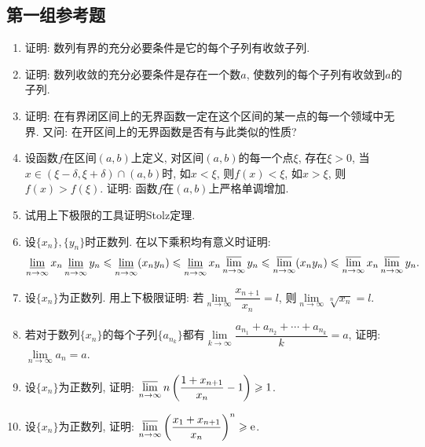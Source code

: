 \documentclass[a4paper,11pt,twoside]{ctexbook}
\newcommand{\e}{\mathrm e}
\begin{document}
\subsection{第一组参考题}
\begin{enumerate}
	\item 证明: 数列有界的充分必要条件是它的每个子列有收敛子列.

	\item 证明: 数列收敛的充分必要条件是存在一个数$a$, 使数列的每个子列有收敛到$a$的子列.

	\item 证明: 在有界闭区间上的无界函数一定在这个区间的某一点的每一个领域中无界. 又问: 在开区间上的无界函数是否有与此类似的性质?

	\item 设函数$f$在区间$(a,b)$上定义, 对区间$(a,b)$的每一个点$\xi$, 存在$\xi>0$, 当$x\in(\xi-\delta,\xi+\delta)\cap(a,b)$时, 如$x<\xi$, 则$f(x)<\xi$, 如$x>\xi$, 则$f(x)>f(\xi)$. 证明: 函数$f$在$(a,b)$上严格单调增加.

	\item 试用上下极限的工具证明Stolz定理.

	\item 设$\{x_n\}, \{y_n\}$时正数列. 在以下乘积均有意义时证明:
	      \[
		      \varliminf_{n\to\infty} x_n \varliminf_{n\to\infty} y_n\leqslant \varliminf_{n\to\infty} (x_ny_n)\leqslant \varliminf_{n\to\infty} x_n \varlimsup_{n\to\infty} y_n \leqslant \varlimsup_{n\to\infty} (x_ny_n) \leqslant \varlimsup_{n\to\infty} x_n \varlimsup_{n\to\infty} y_n.
	      \]

	\item 设$\{x_n\}$为正数列. 用上下极限证明: 若$\lim\limits_{n\to\infty} \dfrac{x_{n+1}}{x_n}=l$, 则$\lim\limits_{n\to\infty} \sqrt[n]{x_n}=l$.

	\item 若对于数列$\{x_n\}$的每个子列$\{a_{n_k}\}$都有$\lim\limits_{k\to\infty} \dfrac{a_{n_1}+a_{n_2}+\cdots+a_{n_k}}{k}=a$, 证明: $\lim\limits_{n\to\infty} a_n=a$.

	\item 设$\{x_n\}$为正数列, 证明: $\varlimsup\limits_{n\to\infty} n\left(\dfrac{1+x_{n+1}}{x_n}-1\right)\geqslant 1$.

	\item 设$\{x_n\}$为正数列, 证明: $\varlimsup\limits_{n\to\infty} \left(\dfrac{x_1+x_{n+1}}{x_n}\right)^n\geqslant \e$.
\end{enumerate}
\end{document}
